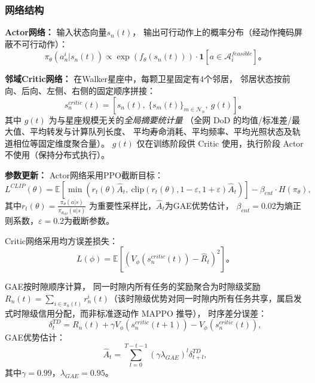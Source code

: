 \documentclass[a4paper,11pt]{article}
\begin{document}
\subsubsection{网络结构}

\textbf{Actor网络：}
输入状态向量$s_n(t)$，
输出可行动作上的概率分布（经动作掩码屏蔽不可行动作）：
\begin{equation}
\pi_\theta(a^i_n | s_n(t))
\propto \exp(f_\theta(s_n(t)))
\cdot \mathbf{1}[a \in \mathcal{A}^{feasible}_i]。
\label{eq:actor}
\end{equation}

\textbf{邻域Critic网络：}
在Walker星座中，每颗卫星固定有4个邻居，
邻居状态按前向、后向、左侧、右侧的固定顺序拼接：
\begin{equation}
s^{critic}_n(t) = [s_n(t),\
\{s_m(t)\}_{m \in \mathcal{N}_n},\ g(t)]。
\label{eq:critic_input}
\end{equation}
其中 $g(t)$ 为与星座规模无关的\emph{全局摘要统计量}
（全网 DoD 的均值/标准差/最大值、平均转发与计算队列长度、
平均寿命消耗、平均频率、平均光照状态及轨道相位等固定维度聚合量）。
$g(t)$ 仅在训练阶段供 Critic 使用，执行阶段 Actor 不使用（保持分布式执行）。

\textbf{参数更新：}
Actor网络采用PPO截断目标：
\begin{equation}
L^{CLIP}(\theta) = \mathbb{E}\left[
\min\left(r_t(\theta)\hat{A}_t,\
\text{clip}(r_t(\theta), 1-\varepsilon, 1+\varepsilon)\hat{A}_t
\right)
\right] - \beta_{ent}\cdot H(\pi_\theta),
\label{eq:ppo}
\end{equation}
其中$r_t(\theta) = \frac{\pi_\theta(a|s)}{\pi_{\theta_{old}}(a|s)}$
为重要性采样比，$\hat{A}_t$为GAE优势估计，
$\beta_{ent}=0.02$为熵正则系数，$\varepsilon=0.2$为截断参数。

Critic网络采用均方误差损失：
\begin{equation}
L(\phi) = \mathbb{E}\left[
(V_\phi(s^{critic}_n(t)) - \hat{R}_t)^2
\right]。
\label{eq:critic_loss}
\end{equation}

GAE按时隙顺序计算，
同一时隙内所有任务的奖励聚合为时隙级奖励
$R_n(t) = \sum_{i \in \pi_n(t)} r^i_n(t)$（该时隙级优势对同一时隙内所有任务共享，属启发式时隙级信用分配，而非标准逐动作 MAPPO 推导），
时序差分误差：
\begin{equation}
\delta^{TD}_t = R_n(t) + \gamma V_\phi(s^{critic}_n(t+1))
- V_\phi(s^{critic}_n(t)),
\label{eq:td_error}
\end{equation}
GAE优势估计：
\begin{equation}
\hat{A}_t = \sum_{l=0}^{T-t-1}
(\gamma\lambda_{GAE})^l\delta^{TD}_{t+l},
\label{eq:gae}
\end{equation}
其中$\gamma=0.99$，$\lambda_{GAE}=0.95$。
\end{document}

